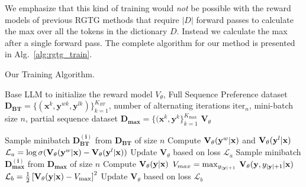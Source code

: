 
We emphasize that this kind of training would \emph{not} be possible with the reward models of previous RGTG methods that require $|D|$ forward passes to calculate the max over all the tokens in the dictionary $D$. 
Instead we calculate the max after a single forward pass. The complete algorithm for our method is presented in Alg.~\ref{alg:rgtg_train}.


\begin{algorithm}[t]
  \small
  \caption{Our Training Algorithm.} %
  \label{alg:rgtg_train}

  \begin{algorithmic}[1]
    \REQUIRE Base LLM to initialize the reward model $V_\theta$, Full Sequence Preference dataset \(\mathbf{D_{BT}} = \{ (\mathbf{x}^k, \mathbf{y}^{wk}, \mathbf{y}^{lk}) \}_{k=1}^{K_{BT}}\), number of alternating iterations $\text{iter}_n$, mini-batch size $n$,  partial sequence dataset \(\mathbf{D_{max}} = \{ (\mathbf{x}^k, \mathbf{y}^{k}\}_{k=1}^{K_\text{max}}\)
    \ENSURE $\mathbf{V}_{\theta}$
    \vspace{1em}
    
    \STATE Sample minibatch $\mathbf{D_{BT}^{(i)}}$ from $\mathbf{D_{BT}}$ of size $n$
        \STATE Compute $\mathbf{V}_{\theta} ({\mathbf{y}}^w|{\mathbf{x}})$ and $\mathbf{V}_{\theta} ({\mathbf{y}}^l|{\mathbf{x}})$
        \STATE $\mathcal{L}_a = \log \sigma ( \mathbf{V}_{\theta} ({\mathbf{y}}^w|{\mathbf{x}}) - \mathbf{V}_{\theta}({\mathbf{y}}^l|{\mathbf{x}}))$
        \STATE Update $\mathbf{V}_{\theta}$ based on loss $\mathcal{L}_a$ 
        \ENDFOR
    \STATE Sample minibatch $\mathbf{D_{max}^{(i)}}$ from $\mathbf{D_{max}}$ of size $n$
        \STATE Compute $\mathbf{V}_{\theta} ({\mathbf{y}}|{\mathbf{x}})$
        \STATE $V_{max} = \max_{y_{|{\mathbf{y}}| + 1}} \:\mathbf{V}_{\theta}({\mathbf{y}}, y_{|{\mathbf{y}}| + 1}|{\mathbf{x}})$
        \STATE $\mathcal{L}_b = \frac{1}{2}\left[\mathbf{V}_{\theta} ({\mathbf{y}}|{\mathbf{x}}) - V_\text{max}\right]^2$
        \STATE Update $\mathbf{V}_{\theta}$ based on loss $\mathcal{L}_b$
        \ENDFOR
    \ENDFOR
  \end{algorithmic}
\end{algorithm}

